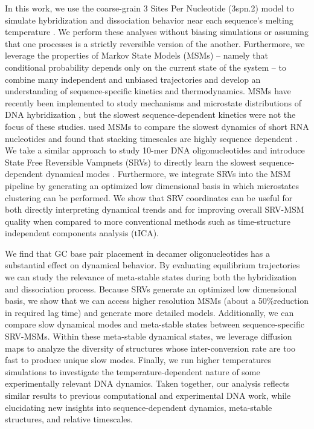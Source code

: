 \documentclass[journal=jpcbfk,manuscript=article]{achemso}
\begin{document}
In this work, we use the coarse-grain 3 Sites Per Nucleotide (3spn.2) model to simulate hybridization and dissociation behavior near each sequence's melting temperature \citep{Hinckley2013AnHybridization}. We perform these analyses without biasing simulations or assuming that one processes is a strictly reversible version of the another. Furthermore, we leverage the properties of Markov State Models (MSMs) -- namely that conditional probability depends only on the current state of the system \citep{Pande2010EverythingAsk} -- to combine many independent and unbiased trajectories and develop an understanding of sequence-specific kinetics and thermodynamics. MSMs have recently been implemented to study mechanisms and microstate distributions of DNA hybridization  \citep{Jin2019, Xiao2019}, but the slowest sequence-dependent kinetics were not the focus of these studies. \citet{Pinamonti2017} used MSMs to compare the slowest dynamics of short RNA nucleotides and found that stacking timescales are highly sequence dependent \citep{Pinamonti2017}. We take a similar approach to study 10-mer DNA oligonucleotides and introduce State Free Reversible Vampnets (SRVs) to directly learn the slowest sequence-dependent dynamical modes \citep{Chen}. Furthermore, we integrate SRVs into the MSM pipeline by generating an optimized low dimensional basis in which microstates clustering can be performed. We show that SRV coordinates can be useful for both directly interpreting dynamical trends and for improving overall SRV-MSM quality when compared to more conventional methods such as time-structure independent components analysis (tICA).

We find that GC base pair placement in decamer oligonucleotides has a substantial effect on dynamical behavior. By evaluating equilibrium trajectories we can study the relevance of meta-stable states during both the hybridization and dissociation process. Because SRVs generate an optimized low dimensional basis, we show that we can access higher resolution MSMs (about a 50\%reduction in required lag time) and generate more detailed models. Additionally, we can compare slow dynamical modes and meta-stable states between sequence-specific SRV-MSMs. Within these meta-stable dynamical states, we leverage diffusion maps to analyze the diversity of structures whose inter-conversion rate are too fast to produce unique slow modes. Finally, we run higher temperatures simulations to investigate the temperature-dependent nature of some experimentally relevant DNA dynamics. Taken together, our analysis reflects similar results to previous computational and experimental DNA work, while elucidating new insights into sequence-dependent dynamics, meta-stable structures, and relative timescales. 
\end{document}
